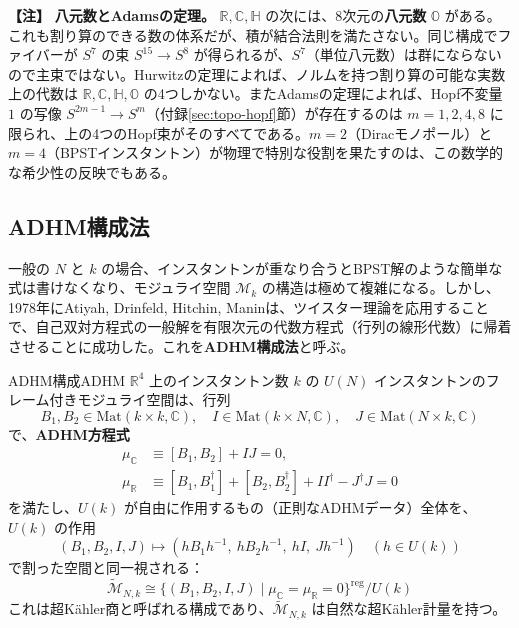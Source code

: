 \documentclass[uplatex, dvipdfmx, book]{jsbook}
\let\origsubsection\subsection
\let\origsubsubsection\subsubsection
\renewcommand{\section}{\origsubsection}
\renewcommand{\subsection}{\origsubsubsection}
\renewcommand{\subsubsection}{\paragraph}
\newenvironment{note}{\vspace{1ex}\par\footnotesize\noindent\textbf{【注】}}{\par\vspace{1ex}}
\begin{document}
\begin{note}
\textbf{八元数とAdamsの定理。}
$\mathbb{R}, \mathbb{C}, \mathbb{H}$ の次には、8次元の\textbf{八元数} $\mathbb{O}$ がある。これも割り算のできる数の体系だが、積が結合法則を満たさない。同じ構成でファイバーが $S^7$ の束 $S^{15} \to S^8$ が得られるが、$S^7$（単位八元数）は群にならないので主束ではない。Hurwitzの定理によれば、ノルムを持つ割り算の可能な実数上の代数は $\mathbb{R}, \mathbb{C}, \mathbb{H}, \mathbb{O}$ の4つしかない。またAdamsの定理によれば、Hopf不変量 $1$ の写像 $S^{2m - 1} \to S^m$（付録\ref{sec:topo-hopf}節）が存在するのは $m = 1, 2, 4, 8$ に限られ、上の4つのHopf束がそのすべてである。$m = 2$（Diracモノポール）と $m = 4$（BPSTインスタントン）が物理で特別な役割を果たすのは、この数学的な希少性の反映でもある。
\end{note}

\section{ADHM構成法}
\label{sec:adhm}

一般の $N$ と $k$ の場合、インスタントンが重なり合うとBPST解のような簡単な式は書けなくなり、モジュライ空間 $\mathcal{M}_{k}$ の構造は極めて複雑になる。しかし、1978年にAtiyah, Drinfeld, Hitchin, Maninは、ツイスター理論を応用することで、自己双対方程式の一般解を有限次元の代数方程式（行列の線形代数）に帰着させることに成功した。これを\textbf{ADHM構成法}と呼ぶ\cite{adhm1978}。

\begin{mythm}{ADHM構成}{ADHM}
$\mathbb{R}^4$ 上のインスタントン数 $k$ の $U(N)$ インスタントンのフレーム付きモジュライ空間は、行列
\begin{equation*}
    B_1, B_2 \in \mathrm{Mat}(k \times k, \mathbb{C}), \quad I \in \mathrm{Mat}(k \times N, \mathbb{C}), \quad J \in \mathrm{Mat}(N \times k, \mathbb{C})
\end{equation*}
で、\textbf{ADHM方程式}
\begin{align*}
    \mu_{\mathbb{C}} &\equiv [B_1, B_2] + IJ = 0, \\
    \mu_{\mathbb{R}} &\equiv [B_1, B_1^\dagger] + [B_2, B_2^\dagger] + II^\dagger - J^\dagger J = 0
\end{align*}
を満たし、$U(k)$ が自由に作用するもの（正則なADHMデータ）全体を、$U(k)$ の作用
\begin{equation*}
    (B_1, B_2, I, J) \mapsto (h B_1 h^{-1},\ h B_2 h^{-1},\ h I,\ J h^{-1}) \quad (h \in U(k))
\end{equation*}
で割った空間と同一視される：
\begin{equation*}
    \widetilde{\mathcal{M}}_{N,k} \cong \{ (B_1, B_2, I, J) \mid \mu_{\mathbb{C}} = \mu_{\mathbb{R}} = 0 \}^{\text{reg}} / U(k)
\end{equation*}
これは超K\"ahler商と呼ばれる構成であり、$\widetilde{\mathcal{M}}_{N,k}$ は自然な超K\"ahler計量を持つ。
\end{mythm}
\end{document}

